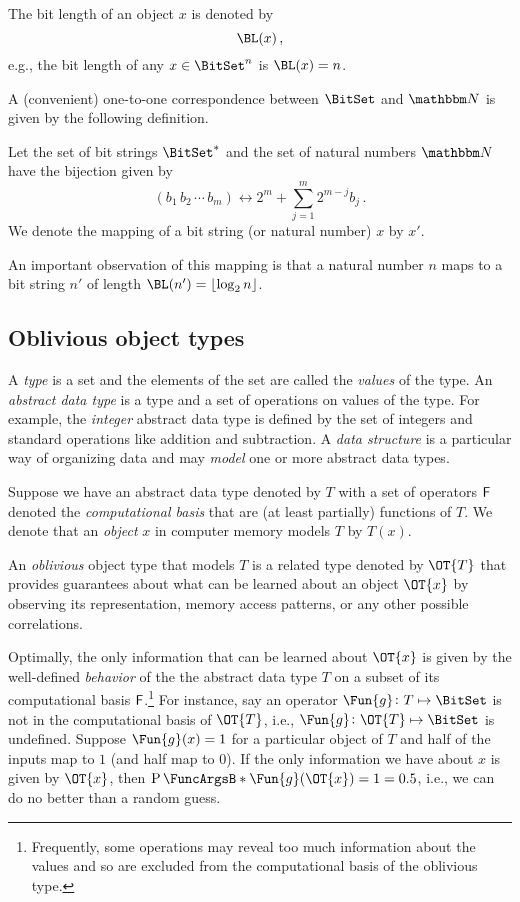 \documentclass[ ../main.tex]{subfiles}
\begin{document}
The bit length of an object $x$ is denoted by
\begin{equation}
\BL(x)\,,
\end{equation}
e.g., the bit length of any $x \in \BitSet^n$ is $\BL(x) = n$.

A (convenient) one-to-one correspondence between $\BitSet$ and $\NatSet$ is given by the following definition.
\begin{definition}
	\label{def:mapping}
	Let the set of bit strings $\BitSet^{*}$ and the set of natural numbers 
	$\NatSet$ have the bijection given by
	\begin{equation}
	(b_1 \, b_2 \, \cdots \, b_m) \longleftrightarrow 2^m + \sum_{j=1}^{m} 2^{m - j} b_j\,.
	\end{equation}
	We denote the mapping of a bit string (or natural number) $x$ by $x'$.
\end{definition}
An important observation of this mapping is that a natural number $n$ maps to a bit string $n'$ of length $\BL(n') = \lfloor \log_2 n \rfloor$.

\subsection{Oblivious object types}
A \emph{type} is a set and the elements of the set are called the \emph{values} of the type.
An \emph{abstract data type} is a type and a set of operations on values of the type.
For example, the \emph{integer} abstract data type is defined by the set of integers and standard operations like addition and subtraction.
A \emph{data structure} is a particular way of organizing data and may \emph{model} one or more abstract data types.

Suppose we have an abstract data type denoted by $T$ with a set of operators $\Set{F}$ denoted the \emph{computational basis} that are (at least partially) functions of $T$.
We denote that an \emph{object} $x$ in computer memory models $T$ by $T(x)$.

An \emph{oblivious} object type\cite{obtype} that models $T$ is a related type denoted by $\OT{T}$ that provides guarantees about what can be learned about an object $\OT{x}$ by observing its representation, memory access patterns, or any other possible correlations.

Optimally, the only information that can be learned about $\OT{x}$ is given by the well-defined \emph{behavior} of the the abstract data type $T$ on a subset of its computational basis $\Set{F}$.\footnote{
Frequently, some operations may reveal too much information about the values and so are excluded from the computational basis of the oblivious type.}
For instance, say an operator $\Fun{g} \colon T \mapsto \BitSet$ is not in the computational basis of $\OT{T}$, i.e., $\Fun{g} \colon \OT{T} \mapsto \BitSet$ is undefined.
Suppose $\Fun{g}(x) = 1$ for a particular object of $T$ and half of the inputs map to $1$ (and half map to $0$).
If the only information we have about $x$ is given by $\OT{x}$, then $\Prob{\Fun{g}(\OT{x})=1} = 0.5$, i.e., we can do no better than a random guess.
\end{document}
